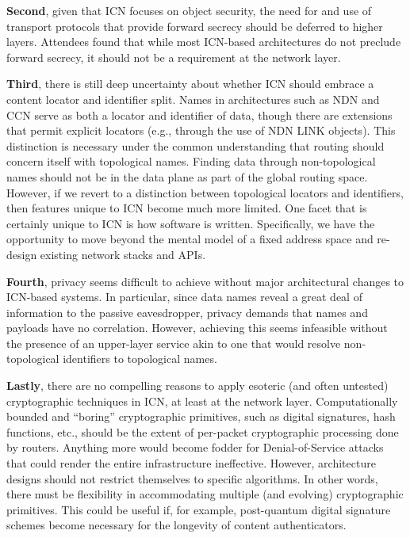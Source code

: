 \documentclass{sig-alternate-10pt}
\begin{document}
{\bf Second}, given that ICN focuses on object security, the need for and use of transport
protocols that provide forward secrecy should be deferred to higher layers. Attendees
found that while most ICN-based architectures do not preclude forward secrecy, it should
not be a requirement at the network layer.

{\bf Third}, there is still deep uncertainty about whether ICN should embrace a content
locator and identifier split. Names in architectures such as NDN and CCN serve as both a
locator and identifier of data, though there are extensions that permit explicit locators
(e.g., through the use of NDN LINK objects). This distinction is necessary under the
common understanding that routing should concern itself with topological names. Finding
data through non-topological names should not be in the data plane as part of the global
routing space. However, if we revert to a distinction between topological locators and
identifiers, then features unique to ICN become much more limited. One facet that is
certainly unique to ICN is how software is written. Specifically, we have the opportunity
to move beyond the mental model of a fixed address space and re-design existing network
stacks and APIs.

{\bf Fourth}, privacy seems difficult to achieve without major architectural changes to
ICN-based systems. In particular, since data names reveal a great deal of information to
the passive eavesdropper, privacy demands that names and payloads have no correlation.
However, achieving this seems infeasible without the presence of an upper-layer service
akin to one that would resolve non-topological identifiers to topological names.

{\bf Lastly}, there are no compelling reasons to apply esoteric (and often untested)
cryptographic techniques in ICN, at least at the network layer. Computationally bounded
and ``boring'' cryptographic primitives, such as digital signatures, hash functions, etc.,
should be the extent of per-packet cryptographic processing done by routers. Anything
more would become fodder for Denial-of-Service attacks that could render the entire
infrastructure ineffective. However, architecture designs should not restrict themselves
to specific algorithms. In other words, there must be flexibility in accommodating
multiple (and evolving) cryptographic primitives. This could be useful if, for example,
post-quantum digital signature schemes become necessary for the longevity of content authenticators.





\end{document}

